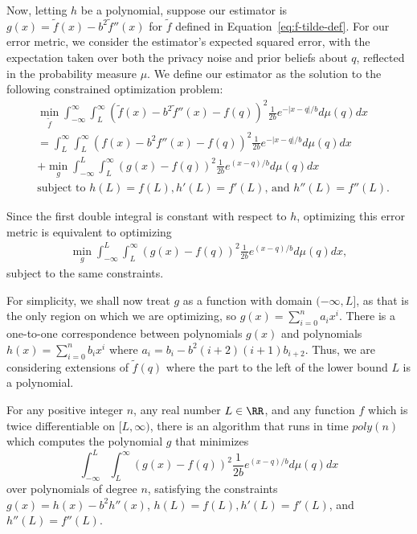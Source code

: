 \documentclass[11pt]{article}
\begin{document}
Now, letting $h$ be a polynomial, suppose our estimator is $g(x) = \tilde{f}(x) - b^2 \tilde{f}''(x)$ for $\tilde{f}$ defined in Equation~\ref{eq:f-tilde-def}. For our error metric, we consider the estimator's expected squared error, with the expectation taken over both the privacy noise and prior beliefs about $q$, reflected in the probability measure $\mu$. We define our estimator as the solution to the following constrained optimization problem:
\begin{align}&\min_{\tilde{f}} \int_{-\infty}^\infty \int_L^\infty \left(\tilde{f}(x)-b^2 \tilde{f}''(x) - f(q)\right)^2 \frac{1}{2b} e^{-|x-q|/b} d\mu(q) dx\\ \nonumber
&= \int_{L}^\infty \int_L^\infty \left(f(x) - b^2 f''(x) -f(q)\right)^2 \frac{1}{2b} e^{-|x-q|/b} d\mu(q) dx \\ \nonumber
&+ \min_g \int_{-\infty}^L \int_L^\infty \left(g(x)-f(q)\right)^2 \frac{1}{2b} e^{(x-q)/b} d\mu(q) dx \\ \nonumber
&\text{subject to $h(L) = f(L), h'(L) = f'(L)$, and $h''(L) = f''(L)$.}
\end{align}

Since the first double integral is constant with respect to $h$, optimizing this error metric is equivalent to optimizing
\begin{align}
    \min_g \int_{-\infty}^L \int_L^\infty \left(g(x)-f(q)\right)^2 \frac{1}{2b} e^{(x-q)/b} d\mu(q) dx,
\end{align}
subject to the same constraints.

For simplicity, we shall now treat $g$ as a function with domain $(-\infty,L]$, as that is the only region on which we are optimizing, so $g(x) = \sum_{i=0}^n a_i x^i$. There is a one-to-one correspondence between polynomials $g(x)$ and polynomials $h(x) = \sum_{i=0}^n b_i x^i$ where $a_i = b_i - b^2(i+2)(i+1)b_{i+2}$. Thus, we are considering extensions of $\tilde{f}(q)$ where the part to the left of the lower bound $L$ is a polynomial.

\begin{theorem}\label{thm:optimal}
    For any positive integer $n$, any real number $L \in \RR$, and any function $f$ which is twice differentiable on $[L,\infty)$, there is an algorithm that runs in time $poly(n)$ which computes the polynomial $g$ that minimizes 
    $$\int_{-\infty}^L \int_L^\infty \left(g(x)-f(q)\right)^2 \frac{1}{2b} e^{(x-q)/b} d\mu(q) dx$$
    over polynomials of degree $n$, satisfying the constraints $g(x) = h(x) - b^2 h''(x)$, $h(L) = f(L), h'(L) = f'(L)$, and $h''(L) = f''(L)$.
\end{theorem}
\end{document}
